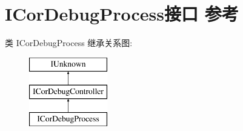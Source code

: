 \hypertarget{interface_i_cor_debug_process}{}\section{I\+Cor\+Debug\+Process接口 参考}
\label{interface_i_cor_debug_process}
类 I\+Cor\+Debug\+Process 继承关系图\+:\begin{figure}[H]
\begin{center}
\leavevmode
\includegraphics[height=3.000000cm]{interface_i_cor_debug_process}
\end{center}
\end{figure}
